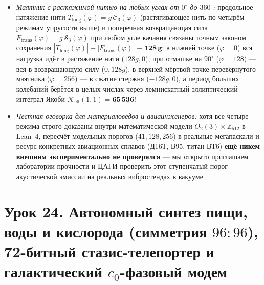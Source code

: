 \begin{itemize}[leftmargin=*]
\begin{itemize}[noitemsep]
    (3)~\textbf{Шейка разупрочнения ($128 < |\Delta\varphi| < 256$):} за перевалом $128$ наклон меняет знак на $-1$: пружина продолжает тянуться, а сила сопротивления падает от $127$ до $1$.
    (4)~\textbf{Противофазный потолок ($|\Delta\varphi| = 256$) и рождение дислокации Бюргерса:} в точке $256$ сила падает в ноль, и на шаге $256 \to 257$ происходит топологический скачок ветви $q_e : 0 \to +1$ --- в плакете ГЦК-металла рождается квантованный вихрь $w_f = +1$ ($\mathcal{B}_f = 512$), то есть \textbf{дислокация Бюргерса в один шаг кристаллической решётки}, накопление которых в треугольной плоскости скольжения $\{111\}$ кубооктаэдра и раскрывает усталостную трещину!
  \item \emph{Маятник с растяжимой нитью на любых углах от $0^\circ$ до $360^\circ$:}
    продольное натяжение нити $T_{\mathrm{long}}(\varphi) = g\,\mathcal{C}_3(\varphi)$ (растягивающее нить по четырём режимам упругости выше) и поперечная возвращающая сила $F_{\mathrm{trans}}(\varphi) = g\,\mathcal{S}_3(\varphi)$ при любом угле качания связаны точным законом сохранения $|T_{\mathrm{long}}(\varphi)| + |F_{\mathrm{trans}}(\varphi)| \equiv \mathbf{128\,g}$: в нижней точке ($\varphi=0$) вся нагрузка идёт в растяжение нити ($128g, 0$), при отмашке на $90^\circ$ ($\varphi=128$) --- вся в возвращающую силу ($0, 128g$), в верхней мёртвой точке перевёрнутого маятника ($\varphi=256$) --- в сжатие стержня ($-128g, 0$), а период больших колебаний берётся в целых числах через лемнискатный эллиптический интеграл Якоби $\mathcal{K}_{\mathrm{ell}}(1,1) = \mathbf{65\,536}$!
  \item \emph{Честная оговорка для материаловедов и авиаинженеров:}
    хотя все четыре режима строго доказаны внутри математической модели $O_2(3)\times\mathbb{Z}_{512}$ в Lean~4, пересчёт модельных порогов ($41, 128, 256$) в реальные мегапаскали и ресурс конкретных авиационных сплавов (Д16Т, В95, титан ВТ6) \textbf{ещё никем внешним экспериментально не проверялся} --- мы открыто приглашаем лаборатории прочности и ЦАГИ проверить этот ступенчатый порог акустической эмиссии на реальных вибростендах в вакууме.
  \end{itemize}
\end{itemize}

\section{Урок 24. Автономный синтез пищи, воды и кислорода (симметрия \texorpdfstring{$96 : 96$}{96 : 96}), 72-битный стазис-телепортер и галактический \texorpdfstring{$c_0$}{c0}-фазовый модем}

